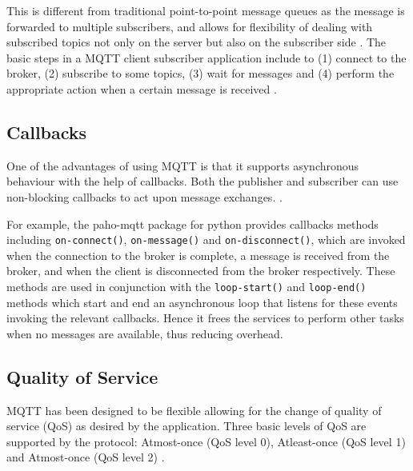 This is different from traditional point-to-point message queues as
the message is forwarded to multiple subscribers, and allows for
flexibility of dealing with subscribed topics not only on the server
but also on the subscriber side \cite{hivemq-details}. The basic steps
in a MQTT client subscriber application include to (1) connect to the broker,
(2) subscribe to some topics, (3) wait for messages and (4) perform the
appropriate action when a certain message is received
\cite{mqtt-wiki}.
 
\subsection{Callbacks}

One of the advantages of using MQTT is that it supports
asynchronous behaviour with the help of callbacks. Both the publisher
and subscriber can use non-blocking callbacks to act upon message exchanges.
\cite{hivemq-details,python-paho-mqtt}.

For example, the paho-mqtt package for python provides callbacks
methods including \verb|on-connect()|, \verb|on-message()| and
\verb|on-disconnect()|, which are invoked when the connection to the
broker is complete, a message is received from the broker, and when
the client is disconnected from the broker respectively. These methods
are used in conjunction with the \verb|loop-start()| and \verb|loop-end()| methods
which start and end an asynchronous loop that listens for these events
invoking the relevant callbacks. Hence it frees the services to perform
other tasks \cite{python-paho-mqtt} when no messages are available,
thus reducing overhead.

\subsection{Quality of Service}

MQTT has been designed to be flexible allowing for the change of
quality of service (QoS) as desired by the application. Three basic
levels of QoS are supported by the protocol:  Atmost-once (QoS level
0), Atleast-once (QoS level 1) and Atmost-once (QoS level 2)
\cite{hivemq-qos,python-paho-mqtt}.

